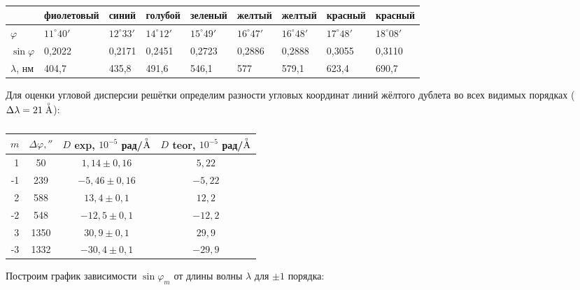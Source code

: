\documentclass[a4paper, 12pt]{article}%
\begin{document}
		\begin{table}[h]
			\caption{}
			\begin{tabular}{|p{0.96cm}|p{2.2cm}|p{1.5cm}|p{1.5cm}|p{1.5cm}|p{1.5cm}|p{1.5cm}|p{1.5cm}|p{1.5cm}|}
				\hline
				& фиолетовый & синий  & голубой & зеленый & желтый & желтый & красный & красный \\ \hline
				$ \varphi $& $ 11^{\circ}40' $ & $ 12^{\circ}33' $ & $ 14^{\circ}12' $ & $ 15^{\circ}49' $ & $ 16^{\circ}47' $ & $ 16^{\circ}48' $ & $ 17^{\circ}48' $ & $ 18^{\circ}08' $ \\ \hline
				$\sin \varphi$& 0,2022     & 0,2171 & 0,2451  & 0,2723  & 0,2886 & 0,2888 & 0,3055  & 0,3110  \\ \hline
				$ \lambda $, нм & 404,7      & 435,8  & 491,6   & 546,1   & 577    & 579,1  & 623,4   & 690,7   \\ \hline
			\end{tabular}
						\centering
		\end{table}
					\textbf{       }
					
					
		Для оценки угловой дисперсии решётки определим разности угловых координат линий жёлтого дублета во всех видимых порядках ($ \Delta \lambda = 21  \buildrel _{\circ} \over {\mathrm{A}} $):
		
		\begin{table}[h]
			\caption{}
			\begin{tabular}{|r|c|c|c|}
				\hline
				$m$  & $ \Delta \varphi , ''$  & $D$ exp,  $ 10^{-5} $ рад/$  \buildrel _{\circ} \over {\mathrm{A}}$   & $D$ teor,   $ 10^{-5} $ рад/$  \buildrel _{\circ} \over {\mathrm{A}}$   \\ \hline
				1  &50      & $1,14\pm 0,16$ & $5,22$  \\ \hline
				-1 & 239     &$-5,46\pm0,16$ & $-5,22$ \\ \hline
				2  & 588     &$13,4\pm0,1$ & $12,2$  \\ \hline
				-2 & 548     &$-12,5\pm 0,1$ & $-12,2$ \\ \hline
				3  & 	1350    &$30,9\pm 0,1$ & $29,9$  \\ \hline
				-3 &1332    & $-30,4\pm 0,1$ & $-29,9$ \\ \hline
			\end{tabular}
			\centering
		\end{table}

		Построим график зависимости $\sin \varphi_m$ от длины волны $\lambda$ для $\pm 1$ порядка:
		
\end{document}
